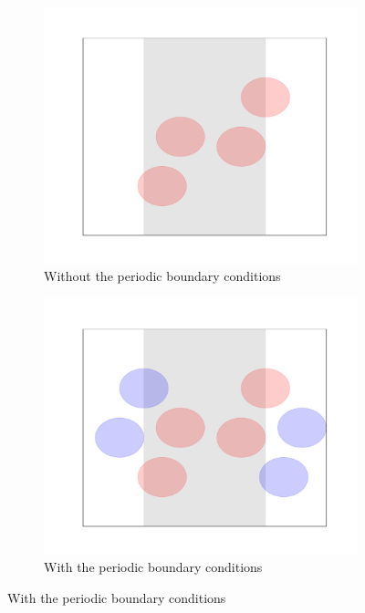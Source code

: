 \documentclass[12pt, oneside]{report}
\begin{document}
\begin{figure}[H]
  \centering

  \begin{subfigure}[b]{0.4\linewidth}
    \includegraphics[width=\linewidth,height=\linewidth]{Images/CieslaAlgorithm/periodic_edge_cond1.pdf}
    \caption{Without the periodic boundary conditions}
  \end{subfigure}
  \begin{subfigure}[b]{0.4\linewidth}
    \includegraphics[width=\linewidth,height=\linewidth]{Images/CieslaAlgorithm/periodic_edge_cond2.pdf}
    \caption{With the periodic boundary conditions}
  \end{subfigure}


\end{figure}
\end{document}
